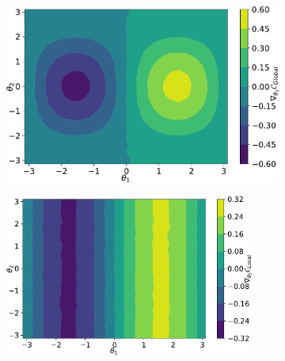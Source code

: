 \documentclass[%
 reprint,
 amsmath,
 amssymb,
 showkeys,
 pra,
 floatfix,
]{revtex4-2}
\begin{document}
\begin{figure}[t]
\begin{subfigure}[b]{0.48\linewidth}
\begin{minipage}{0.9\textwidth}
    \end{minipage}
    \end{subfigure}\\
    \begin{subfigure}[b]{0.48\linewidth}
    \begin{minipage}
    {.03\textwidth}
        \caption{}
        \label{fig:barren-plateau-3}
    \end{minipage}%
    \begin{minipage}{0.90\textwidth}
        \includegraphics[width=.9\linewidth]{images/Global_cost_grad_landscape.pdf}
    \end{minipage}
    \end{subfigure}
    \begin{subfigure}[b]{0.48\textwidth}
    \begin{minipage}{.08\textwidth}
        \caption{}
        \label{fig:barren-plateau-4}
    \end{minipage}%
    \begin{minipage}{0.9\textwidth}
        \includegraphics[width=0.9\textwidth]{images/Local_cost_grad_landscape.pdf}

\end{minipage}
\end{subfigure}
\end{figure}
\end{document}
